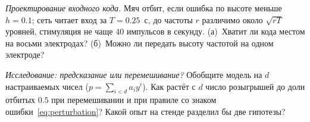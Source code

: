 \begin{exercise}[\lvlB]
\label{ex:22:6}
\emph{Проектирование входного кода.} Мяч отбит, если ошибка по высоте меньше $h=0.1$; сеть читает вход за $T=0.25$~с, до частоты $r$ различимо около $\sqrt{rT}$ уровней, стимуляция не чаще $40$ импульсов в секунду. (а)~Хватит ли кода местом на восьми электродах? (б)~Можно ли передать высоту частотой на одном электроде?
\end{exercise}

\begin{exercise}[\lvlC]
\label{ex:22:7}
\emph{Исследование: предсказание или перемешивание?} Обобщите модель на $d$ настраиваемых чисел ($p=\sum_{i<d}a_iy^i$). Как растёт с $d$ число розыгрышей до доли отбитых $0.5$ при перемешивании и при правиле со знаком ошибки~\eqref{eq:perturbation}? Какой опыт на стенде разделил бы две гипотезы?
\end{exercise}

